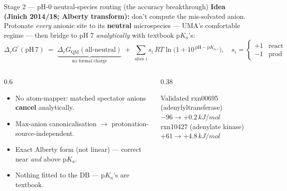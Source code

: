 \documentclass[aspectratio=169,11pt]{beamer}
\newcommand{\kj}{\,kJ/mol}
\newcommand{\arw}{$\rightarrow$}
\begin{document}
\begin{frame}{Stage 2 — pH-0 neutral-species routing \small(the accuracy breakthrough)}
  \textbf{Idea (Jinich 2014/18; Alberty transform):} don't compute the mis-solvated anion.
  Protonate \emph{every} anionic site to its \textbf{neutral} microspecies — UMA's comfortable
  regime — then bridge to pH 7 \emph{analytically} with textbook p$K_a$'s:
  \[
    \Delta_r G^{\prime}(\mathrm{pH\,7}) \;=\; \underbrace{\Delta_r G_{\mathrm{QM}}(\text{all-neutral})}_{\text{no formal charge}}
    \;+\; \sum_{\text{sites }i} s_i\, RT\ln\!\big(1+10^{\,\mathrm{pH}-\mathrm{p}K_{a,i}}\big),
    \quad s_i=\!\begin{cases}+1&\text{react}\\-1&\text{prod}\end{cases}
  \]
  \begin{columns}[T]
    \begin{column}{0.6\textwidth}
      \begin{itemize}
        \item No atom-mapper: matched spectator anions \textbf{cancel} analytically.
        \item Max-anion canonicalisation \arw{} protonation-source-independent.
        \item Exact Alberty form (not linear) — correct near \emph{and} above p$K_a$.
        \item Nothing fitted to the DB — p$K_a$'s are textbook.
      \end{itemize}
    \end{column}
    \begin{column}{0.38\textwidth}
      \begin{block}{Validated}
        rxn00695 (adenylyltransferase)\\ \quad $-96 \to \mathbf{+0.2}\kj$\\[0.2em]
        rxn10427 (adenylate kinase)\\ \quad $+61 \to \mathbf{+4.8}\kj$
      \end{block}
    \end{column}
  \end{columns}
\end{frame}
\end{document}
